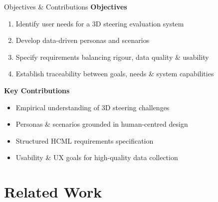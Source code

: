\documentclass[aspectratio=169, 10pt]{beamer}
\begin{document}
\begin{frame}{Objectives \& Contributions}
  \textbf{Objectives}
  \begin{enumerate}
    \item Identify user needs for a 3D steering evaluation system
    \item Develop data-driven personas and scenarios
    \item Specify requirements balancing rigour, data quality \& usability
    \item Establish traceability between goals, needs \& system capabilities
  \end{enumerate}

  \vspace{0.5em}
  \textbf{Key Contributions}
  \begin{itemize}
    \item Empirical understanding of 3D steering challenges
    \item Personas \& scenarios grounded in human-centred design
    \item Structured HCML requirements specification
    \item Usability \& UX goals for high-quality data collection
  \end{itemize}
\end{frame}

\section{Related Work}
\end{document}

